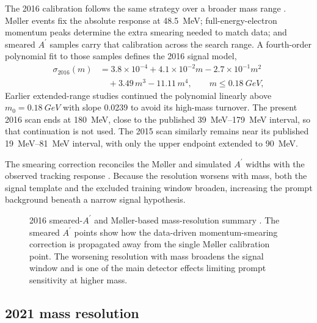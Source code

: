 The 2016 calibration follows the same strategy over a broader mass range
\cite{HPS2016BumpInternal,HPS2016PromptLong}. M{\o}ller events fix the absolute
response at \SI{48.5}{MeV}; full-energy-electron momentum peaks determine the extra
smearing needed to match data; and smeared $A^\prime$ samples carry that calibration
across the search range. A fourth-order polynomial fit to those samples defines the
2016 signal model,
\begin{align}
\sigma_{2016}(m) &= 3.8\times10^{-4} + 4.1\times10^{-2}m - 2.7\times10^{-1}m^2 \nonumber\\
&\quad + 3.49\,m^3 - 11.11\,m^4,
\qquad m \le \SI{0.18}{GeV},
\label{eq:sigma2016}
\end{align}
Earlier extended-range studies continued the polynomial linearly above
$m_0=\SI{0.18}{GeV}$ with slope \num{0.0239} to avoid its high-mass turnover. The
present 2016 scan ends at \SI{180}{MeV}, close to the published \SIrange{39}{179}{MeV}
interval, so that continuation is not used. The 2015 scan similarly remains near its
published \SIrange{19}{81}{MeV} interval, with only the upper endpoint extended to
\SI{90}{MeV}.

The smearing correction reconciles the M{\o}ller and simulated $A^\prime$ widths with
the observed tracking response \cite{HPS2016BumpInternal,HPS2016PromptLong}. Because
the resolution worsens with mass, both the signal template and the excluded training
window broaden, increasing the prompt background beneath a narrow signal hypothesis.

\begin{figure}[H]
\centering
{}
\caption{2016 smeared-$A^\prime$ and M{\o}ller-based mass-resolution summary
\cite{HPS2016BumpInternal}. The smeared $A^\prime$ points show how the data-driven
momentum-smearing correction is propagated away from the single M{\o}ller calibration
point. The worsening resolution with mass broadens the signal window and is one of the
main detector effects limiting prompt sensitivity at higher mass.}
\label{fig:2016-resolution}
\end{figure}

\subsection{2021 mass resolution}
\label{sec:massres-2021}

